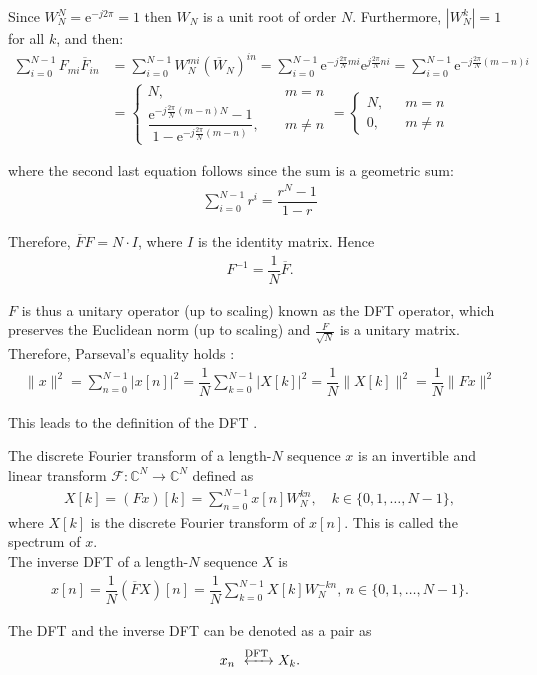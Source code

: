 Since $W_N^N = \text{e}^{-j2\pi} = 1$ then $W_N$ is a unit root of order $N$. Furthermore, $|W_N^k| = 1$ for all $k$, and then:
\begin{align*}
\sum_{i=0}^{N-1} F_{mi} \overline{F}_{in} &= \sum_{i=0}^{N-1} W_N^{mi} (\overline{W}_N)^{in} = \sum_{i=0}^{N-1} \text{e}^{-j\frac{2\pi}{N}mi} \text{e}^{j\frac{2\pi}{N}ni} = \sum_{i=0}^{N-1} \text{e}^{-j\frac{2\pi}{N}(m-n)i} \\ &=
\begin{cases}
N, &m = n \\
\dfrac{\text{e}^{-j\frac{2\pi}{N}(m-n)N}-1}{1-\text{e}^{-j\frac{2\pi}{N}(m-n)}}, \quad &m \neq n
\end{cases} =
\begin{cases}
N, &m = n \\
0, \quad &m \neq n
\end{cases}
\end{align*}

where the second last equation follows since the sum is a geometric sum:
\begin{align*}
\sum_{i=0}^{N-1} r^i = \dfrac{r^N-1}{1-r}
\end{align*}

Therefore, $\overline{F}F = N \cdot I$, where $I$ is the identity matrix. Hence
\begin{align*}
F^{-1} = \dfrac{1}{N} \overline{F}.
\end{align*}

$F$ is thus a unitary operator (up to scaling) known as the DFT operator, which preserves the Euclidean norm (up to scaling) and $\frac{F}{\sqrt{N}}$ is a unitary matrix. Therefore, Parseval's equality holds \cite{page 258, FSP}:
\begin{align*}
\|x\|^2 = \sum_{n=0}^{N-1} |x[n]|^2 = \dfrac{1}{N} \sum_{k=0}^{N-1} |X[k]|^2 = \dfrac{1}{N} \|X[k]\|^2 = \dfrac{1}{N} \|Fx\|^2
\end{align*}

This leads to the definition of the DFT \cite{page 253, FSP}.

\begin{definition}
The discrete Fourier transform of a length-$N$ sequence $x$ is an invertible and linear transform $\mathcal{F}: \mathbb{C}^N \to \mathbb{C}^N$ defined as
\begin{align} \label{eq:def_DFT}
	X[k] = (Fx)[k] = \sum_{n=0}^{N-1} x[n] W_N^{kn}, \quad k\in \{0, 1, \dots, N-1\},
\end{align}
where $X[k]$ is the discrete Fourier transform of $x[n]$. This is called the spectrum of $x$. \\
The inverse DFT of a length-$N$ sequence $X$ is
\begin{align*}
	x[n] = \dfrac{1}{N}(\overline{F}X)[n] = \dfrac{1}{N}\sum_{k=0}^{N-1} X[k] W_N^{-kn}, \, n \in \{0,1,\dots,N-1\}.
\end{align*}

The DFT and the inverse DFT can be denoted as a pair as
\begin{align*}
	x_n \xleftrightarrow{\text{DFT}} X_k.
\end{align*}
\end{definition}

